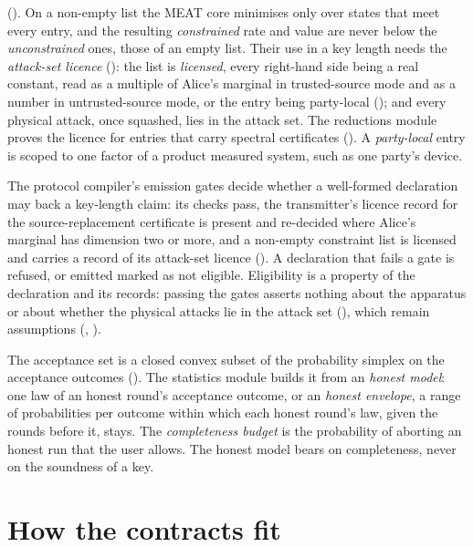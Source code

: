 \begin{description}[leftmargin=0pt,itemsep=3pt]
  (). On a non-empty list the MEAT core
  minimises only over states that meet every entry, and the resulting
  \emph{constrained} rate and value are never below the \emph{unconstrained}
  ones, those of an empty list. Their use in a key length needs the
  \emph{attack-set licence} (): the list is
  \emph{licensed}, every right-hand side being a real constant, read as a
  multiple of Alice's marginal in trusted-source mode and as a number in
  untrusted-source mode, or the entry being party-local
  (); and every physical attack, once squashed,
  lies in the attack set. The reductions module proves
  the licence for entries that carry spectral certificates
  (). A \emph{party-local} entry is scoped to one
  factor of a product measured system, such as one party's device.
\item[Key-length eligibility.] The protocol compiler's emission gates decide
  whether a well-formed declaration may back a key-length claim: its checks
  pass, the transmitter's licence record for the source-replacement
  certificate is present and re-decided where Alice's marginal has dimension
  two or more, and a non-empty constraint list is licensed and carries a
  record of its attack-set licence (). A
  declaration that fails a gate is refused, or emitted marked as not eligible.
  Eligibility is a property of the declaration and its records: passing the
  gates asserts nothing about the apparatus or about whether the physical
  attacks lie in the attack set (), which
  remain assumptions (,
  ).
\item[Acceptance set; honest model; completeness.] The acceptance set is a
  closed convex subset of the probability simplex on the acceptance outcomes
  (). The statistics module builds it from an
  \emph{honest model}: one law of an honest round's acceptance outcome, or an
  \emph{honest envelope}, a range of probabilities per outcome within which
  each honest round's law, given the rounds before it, stays. The
  \emph{completeness budget} is the probability of aborting an honest run that
  the user allows. The honest model bears on completeness, never on the
  soundness of a key.
\end{description}

\section*{How the contracts fit}

